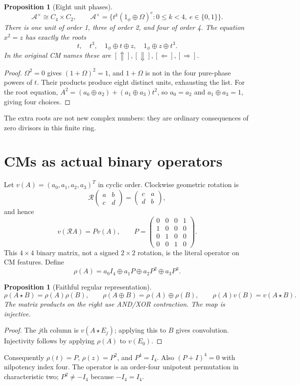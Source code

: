 \documentclass[11pt,a4paper]{article}
\newtheorem{proposition}[theorem]{Proposition}
\theoremstyle{definition}\newtheorem{definition}[theorem]{Definition}
\theoremstyle{remark}\newtheorem{remark}[theorem]{Remark}
\newcommand{\alg}{\mathcal A}
\newcommand{\rot}{\mathcal R}
\newcommand{\cm}[4]{\begin{pmatrix}#1&#2\\#3&#4\end{pmatrix}}
\newcommand{\one}{1_{\phi}}
\numberwithin{equation}{section}
\begin{document}
\begin{proposition}[Eight unit phases]
\begin{equation}
 \alg^\times\cong C_4\times C_2,
 \qquad\alg^\times=\{t^k(\one\oplus\Omega)^e:0\le k<4,\ e\in\{0,1\}\}.
\end{equation}
There is one unit of order 1, three of order 2, and four of order 4. The equation $x^2=z$ has exactly the roots
\begin{equation}
 t,\quad t^3,\quad \one\oplus t\oplus z,\quad \one\oplus z\oplus t^3.
\end{equation}
In the original CM names these are $[\Uparrow],[\Downarrow],[\Leftarrow],[\Rightarrow]$.
\end{proposition}
\begin{proof}
$\Omega^2=0$ gives $(1+\Omega)^2=1$, and $1+\Omega$ is not in the four pure-phase powers of $t$. Their products produce eight distinct units, exhausting the list. For the root equation, $A^2=(a_0\oplus a_2)+(a_1\oplus a_3)t^2$, so $a_0=a_2$ and $a_1\oplus a_3=1$, giving four choices.
\end{proof}
The extra roots are not new complex numbers: they are ordinary consequences of zero divisors in this finite ring.

\section{CMs as actual binary operators}\label{sec:operators}
Let $v(A)=(a_0,a_1,a_2,a_3)^T$ in cyclic order. Clockwise geometric rotation is
\begin{equation}
 \rot\cm abcd=\cm cadb,
\end{equation}
and hence
\begin{equation}\label{eq:P}
 v(\rot A)=Pv(A),\qquad
 P=\begin{pmatrix}0&0&0&1\\1&0&0&0\\0&1&0&0\\0&0&1&0\end{pmatrix}.
\end{equation}
This $4\times4$ binary matrix, not a signed $2\times2$ rotation, is the literal operator on CM features. Define
\begin{equation}\label{eq:regular}
 \rho(A)=a_0I_4\oplus a_1P\oplus a_2P^2\oplus a_3P^3.
\end{equation}
\begin{proposition}[Faithful regular representation]
\begin{equation}
 \rho(A\star B)=\rho(A)\rho(B),\qquad
 \rho(A\oplus B)=\rho(A)\oplus\rho(B),\qquad
 \rho(A)v(B)=v(A\star B).
\end{equation}
The matrix products on the right use AND/XOR contraction. The map is injective.
\end{proposition}
\begin{proof}
The $j$th column is $v(A\star E_j)$; applying this to $B$ gives convolution. Injectivity follows by applying $\rho(A)$ to $v(E_0)$.
\end{proof}
Consequently $\rho(t)=P$, $\rho(z)=P^2$, and $P^4=I_4$. Also $(P+I)^4=0$ with nilpotency index four. The operator is an order-four unipotent permutation in characteristic two; $P^2\ne-I_4$ because $-I_4=I_4$.
\end{document}
